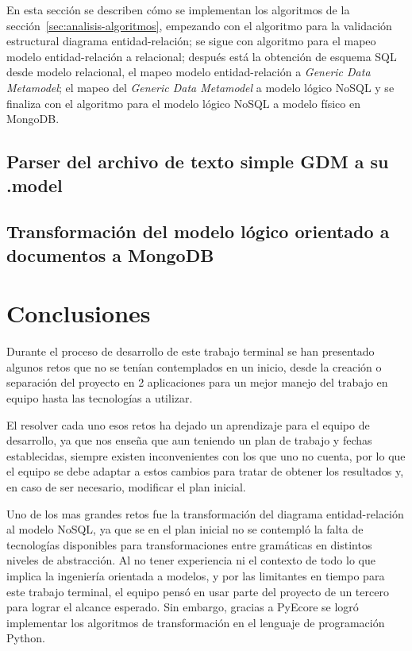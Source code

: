 En esta sección se describen cómo se implementan los algoritmos de la sección~\ref{sec:analisis-algoritmos}, empezando con el algoritmo para la validación estructural diagrama entidad-relación; se sigue con algoritmo para el mapeo modelo entidad-relación a relacional; después está la obtención de esquema SQL desde modelo relacional, el mapeo modelo entidad-relación a \textit{Generic Data Metamodel}; el mapeo del \textit{Generic Data Metamodel} a modelo lógico NoSQL y se finaliza con el algoritmo para el modelo lógico NoSQL a modelo físico en MongoDB.



\subsection{Parser del archivo de texto simple GDM a su .model}

\subsection{Transformación del modelo lógico orientado a documentos a MongoDB}


\section{Conclusiones}
Durante el proceso de desarrollo de este trabajo terminal se han presentado algunos retos que no se tenían contemplados en un inicio, desde la creación o separación del proyecto en 2 aplicaciones para un mejor manejo del trabajo en equipo hasta las tecnologías a utilizar. 

El resolver cada uno esos retos ha dejado un aprendizaje para el equipo de desarrollo, ya que nos enseña que aun teniendo un plan de trabajo y fechas establecidas, siempre existen inconvenientes con los que uno no cuenta, por lo que el equipo se debe adaptar a estos cambios para tratar de obtener los resultados y, en caso de ser necesario, modificar el plan inicial.

Uno de los mas grandes retos fue la transformación del diagrama entidad-relación al modelo NoSQL, ya que se en el plan inicial no se contempló la falta de tecnologías disponibles para transformaciones entre gramáticas en distintos niveles de abstracción. Al no tener experiencia ni el contexto de todo lo que implica la ingeniería orientada a modelos, y por las limitantes en tiempo para este trabajo terminal, el equipo pensó en usar parte del proyecto de un tercero para lograr el alcance esperado. Sin embargo, gracias a PyEcore\cite{pyecore_pyecore_2020} se logró implementar los  algoritmos de transformación en el lenguaje de programación Python.